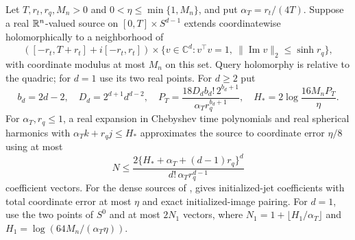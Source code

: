 \begin{lemma}
\label{cp:harmonic-approximation}
Let $T,r_t,r_q,M_n>0$ and $0<\eta\le\min\{1,M_n\}$, and put
$\alpha_T=r_t/(4T)$. Suppose a real $\mathbb R^n$-valued source on
$[0,T]\times S^{d-1}$ extends coordinatewise holomorphically to a neighborhood of
\[
 ([-r_t,T+r_t]+i[-r_t,r_t])\times
 \{v\in\mathbb C^d:v^\top v=1,\ \|\operatorname{Im}v\|_2\le\sinh r_q\},
\]
with coordinate modulus at most $M_n$ on this set. Query holomorphy is
relative to the quadric; for $d=1$ use its two real points.
For $d\ge2$ put
\[
 b_d=2d-2,\quad
 D_d=2^{d+1}d^{d-2},\quad
 P_T=\frac{18D_db_d!\,2^{b_d+1}}{\alpha_T r_q^{b_d+1}},
 \quad H_*=2\log\frac{16M_nP_T}{\eta}.
\]
For $\alpha_T,r_q\le1$, a real expansion in Chebyshev time polynomials and
real spherical harmonics with $\alpha_Tk+r_qj\le H_*$ approximates the source
to coordinate error $\eta/8$ using at most
\begin{equation}
 N\le\frac{2\{H_*+\alpha_T+(d-1)r_q\}^d}
                {d!\,\alpha_T r_q^{d-1}}
 \label{cp:harmonic-dimension}
\end{equation}
coefficient vectors. For the dense sources of ,
 gives initialized-jet coefficients with total coordinate
error at most $\eta$ and exact initialized-image pairing.
For $d=1$, use the two points of $S^0$ and at most $2N_1$ vectors,
where $N_1=1+\lfloor H_1/\alpha_T\rfloor$ and
$H_1=\log(64M_n/(\alpha_T\eta))$.
\end{lemma}

